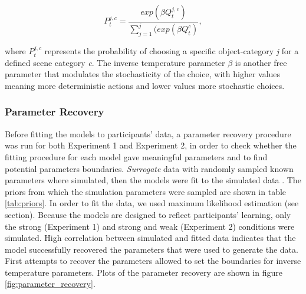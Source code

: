 \documentclass[a4paper,12pt]{article}
\begin{document}
\begin{equation}
P_t^{j,c} = \dfrac{ exp({\beta} {Q}_t^{j,c})   }
{ \sum_{j=1}^j (exp({\beta} {Q}_t^c) },  
\end{equation}

\noindent
where $P_t^{j,c}$ represents the probability of choosing a specific object-category \textit{j} for a defined scene category \textit{c}. The inverse temperature parameter $\beta$ is another free parameter that modulates the stochasticity of the choice, with higher values meaning more deterministic actions and lower values more stochastic choices. 

\subsubsection{Parameter Recovery} Before fitting the models to participants' data, a parameter recovery procedure was run for both Experiment 1 and Experiment 2, in order to check whether the fitting procedure for each model gave meaningful parameters and to find potential parameters boundaries. \textit{Surrogate} data with randomly sampled known parameters where simulated, then the models were fit to the simulated data \citep[see][]{Wilson2019a}. The priors from which the simulation parameters were sampled are shown in table \ref{tab:priors}. In order to fit the data, we used maximum likelihood estimation (see section). Because the models are designed to reflect participants' learning, only the strong (Experiment 1) and strong and weak (Experiment 2) conditions were simulated. High correlation between simulated and fitted data indicates that the model successfully recovered the parameters that were used to generate the data. First attempts to recover the parameters allowed to set the boundaries for inverse temperature parameters. Plots of the parameter recovery are shown in figure \ref{fig:parameter_recovery}.




\begin{table} 
    \centering 
    \caption{Priors for the parameters}
    \label{tab:priors}
    \end{table}
\end{document}
